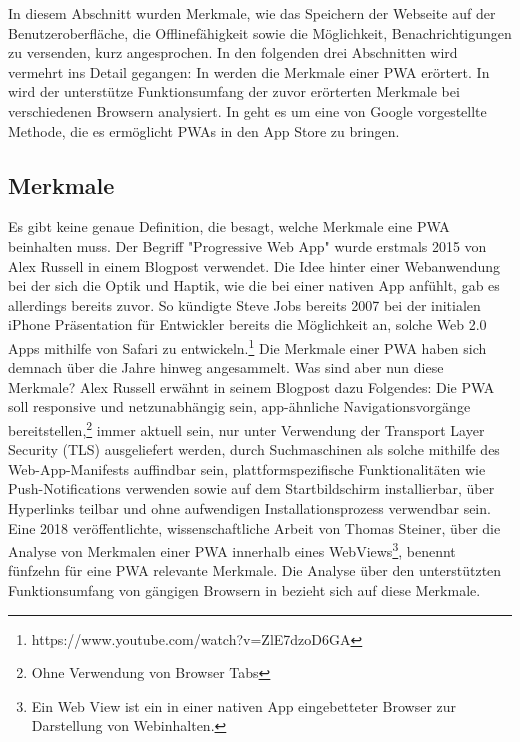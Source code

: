 In diesem Abschnitt wurden Merkmale, wie das Speichern der Webseite auf der Benutzeroberfläche,
die Offlinefähigkeit sowie die Möglichkeit, Benachrichtigungen zu versenden, kurz angesprochen.
In den folgenden drei Abschnitten wird vermehrt ins Detail gegangen: In 
werden die Merkmale einer PWA erörtert. In 
wird der unterstütze Funktionsumfang der zuvor erörterten Merkmale bei verschiedenen Browsern
analysiert. In  geht es um eine von Google vorgestellte Methode,
die es ermöglicht PWAs in den App Store zu bringen.

\subsection{Merkmale}
\label{subsec:markmale}
Es gibt keine genaue Definition, die besagt, welche Merkmale eine PWA beinhalten muss.
Der Begriff "Progressive Web App" wurde erstmals 2015 von Alex Russell in einem Blogpost
verwendet.\cite{PWA2015} Die Idee hinter einer Webanwendung bei der sich die Optik und Haptik,
wie die bei einer nativen App anfühlt, gab es allerdings bereits zuvor. So kündigte
Steve Jobs bereits 2007 bei der initialen iPhone Präsentation für Entwickler bereits die Möglichkeit
an, solche Web 2.0 Apps mithilfe von Safari zu entwickeln.\footnote{https://www.youtube.com/watch?v=ZlE7dzoD6GA}
Die Merkmale einer PWA haben sich demnach über die Jahre hinweg angesammelt. Was sind aber
nun diese Merkmale? Alex Russell erwähnt in seinem Blogpost dazu Folgendes:
Die PWA soll responsive und netzunabhängig sein, app-ähnliche Navigationsvorgänge bereitstellen,\footnote{Ohne Verwendung von Browser Tabs} 
immer aktuell sein, nur unter Verwendung der Transport Layer Security (TLS) ausgeliefert werden, durch Suchmaschinen als solche mithilfe
des Web-App-Manifests auffindbar sein, plattformspezifische Funktionalitäten wie Push-Notifications
verwenden sowie auf dem Startbildschirm installierbar, über Hyperlinks teilbar und ohne aufwendigen
Installationsprozess verwendbar sein.\cite{PWA2015} Eine 2018 veröffentlichte, wissenschaftliche
Arbeit von Thomas Steiner, über die Analyse von Merkmalen einer PWA innerhalb eines WebViews\footnote{Ein Web View ist ein in einer nativen App eingebetteter Browser zur Darstellung von Webinhalten.},
benennt fünfzehn für eine PWA relevante Merkmale. Die Analyse über den unterstützten Funktionsumfang
von gängigen Browsern in 
bezieht sich auf diese Merkmale.\cite{WhatIsInAWebView}

